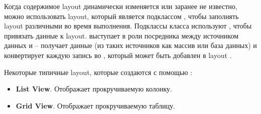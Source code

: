 
Когда содержимое layout динамически изменяется или заранее не известно, можно
использовать layout, который является подклассом \AdapterView, чтобы заполнять
layout различными \View во время выполнения. Подклассы класса \AdapterView
используют \Adapter, чтобы привязать данные к layout. \Adapter выступает в роли
посредника между источником данных и \AdapterView -- \Adapter получает данные
(из таких источников как массив или база данных) и конвертирует каждую запись
во \View, который может быть добавлен в layout \AdapterView.

Некоторые типичные layout, которые создаются с помощью \Adapter:
\begin{itemize}
  \item \textbf{List View}. Отображает прокручиваемую колонку.
  
  \item \textbf{Grid View}. Отображает прокручиваемую таблицу.
\end{itemize}


